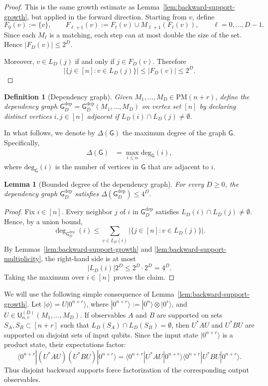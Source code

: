 \documentclass[12pt]{article}
\newtheorem{lemma}[theorem]{Lemma}
\newtheorem{definition}{Definition}[section]
\begin{document}
\begin{proof}
This is the same growth estimate as Lemma~\ref{lem:backward-support-growth},
but applied in the forward direction. Starting from \(v\), define
\[
F_0(v):=\{v\},
\qquad
F_{\ell+1}(v):=F_\ell(v)\cup M_{\ell+1}(F_\ell(v)),
\qquad
\ell=0,\dots,D-1.
\]
Since each \(M_\ell\) is a matching, each step can at most double the size of
the set. Hence $|F_D(v)|\le 2^D$.

Moreover, \(v\in L_D(j)\) if and only if \(j\in F_D(v)\). Therefore
\[
|\{j\in[n]:v\in L_D(j)\} |
\le
|F_D(v)|
\le 2^D.
\]
\end{proof}


\begin{definition}[Dependency graph]
\label{def:dependency-graph}
Given \(M_1,\dots,M_D \in \mathrm{PM}(n+r)\), define the dependency graph $\mathsf{G}^{\mathrm{dep}}_D=\mathsf{G}^{\mathrm{dep}}_D(M_1,\dots,M_D)$ on vertex set \([n]\) by declaring distinct vertices $i,j \in [n]$ adjacent if $L_D(i)\cap L_D(j)\neq\emptyset$.
\end{definition}

In what follows, we denote by $\Delta(\mathsf{G})$ the maximum degree of the graph $\mathsf{G}.$ Specifically, 
\begin{align*}
    \Delta(\mathsf{G}) &= \max_{i \le n} \mathrm{deg}_{\mathsf{G}}(i),
\end{align*}
where $\mathrm{deg}_{\mathsf{G}}(i)$ is the number of vertices in $\mathsf{G}$ that are adjacent to $i$.

\begin{lemma}[Bounded degree of the dependency graph]
\label{lem:dependency-degree}
For every $D \ge 0$, the dependency graph $\mathsf{G}^{\mathrm{dep}}_D$ satisfies $\Delta(\mathsf{G}^{\mathrm{dep}}_D)\le 4^D$. 
\end{lemma}
\begin{proof}
Fix \(i\in[n]\). Every neighbor \(j\) of \(i\) in
\(\mathsf G_D^{\mathrm{dep}}\) satisfies
\(L_D(i)\cap L_D(j)\neq\emptyset\). Hence, by a union bound,
\[
\deg_{\mathsf G_D^{\mathrm{dep}}}(i)
\le
\sum_{v\in L_D(i)}
|\{j\in[n]:v\in L_D(j)\} |.
\]
By Lemmas~\ref{lem:backward-support-growth} and
\ref{lem:backward-support-multiplicity}, the right-hand side is at most
\[
|L_D(i)|2^D\le 2^D\cdot 2^D=4^D.
\]
Taking the maximum over \(i\in[n]\) proves the claim.
\end{proof}


We will use the following simple consequence of Lemma~\ref{lem:backward-support-growth}. 
Let \(|\phi\rangle=U|0^{n+r}\rangle\), where
\(|0^{n+r}\rangle:=|0^n\rangle\otimes |0^r\rangle\), and
\(U\in\mathsf{U}^{(D)}_{n,r}(M_1,\dots,M_D)\). If observables \(A\) and \(B\)
are supported on sets \(S_A,S_B\subset[n+r]\) such that
\(L_D(S_A)\cap L_D(S_B)=\emptyset\), then \(U^*AU\) and \(U^*BU\) are
supported on disjoint sets of input qubits. Since the input state
\(|0^{n+r}\rangle\) is a product state, their expectations factor:
\[
\langle 0^{n+r}|(U^*AU)(U^*BU)|0^{n+r}\rangle
=
\langle 0^{n+r}|U^*AU|0^{n+r}\rangle
\langle 0^{n+r}|U^*BU|0^{n+r}\rangle .
\]
Thus disjoint backward supports force factorization of the corresponding
output observables.
\end{document}
